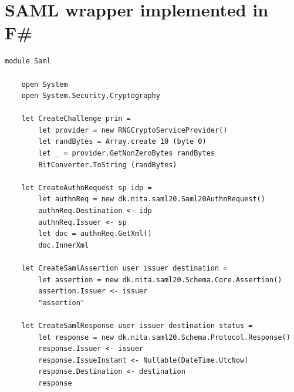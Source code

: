 \documentclass[twosided]{report}
\begin{document}
\section{SAML wrapper implemented in F\#}
\begin{lstlisting}[style=fstar, caption={Example of implementation of SAML functions in F\# \cite{jacob}.}]
	module Saml

	open System
	open System.Security.Cryptography
	
	let CreateChallenge prin = 
		let provider = new RNGCryptoServiceProvider()
		let randBytes = Array.create 10 (byte 0)
		let _ = provider.GetNonZeroBytes randBytes
		BitConverter.ToString (randBytes)
	
	let CreateAuthnRequest sp idp = 
		let authnReq = new dk.nita.saml20.Saml20AuthnRequest()
		authnReq.Destination <- idp
		authnReq.Issuer <- sp
		let doc = authnReq.GetXml()
		doc.InnerXml
	
	let CreateSamlAssertion user issuer destination = 
		let assertion = new dk.nita.saml20.Schema.Core.Assertion()
		assertion.Issuer <- issuer
		"assertion"
	
	let CreateSamlResponse user issuer destination status =
		let response = new dk.nita.saml20.Schema.Protocol.Response()
		response.Issuer <- issuer
		response.IssueInstant <- Nullable(DateTime.UtcNow)
		response.Destination <- destination
		response
\end{lstlisting}
\clearpage
\end{document}
